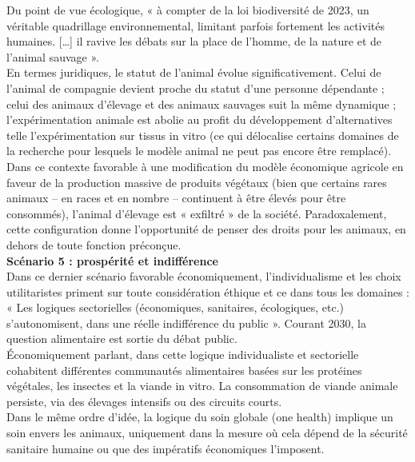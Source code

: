 \documentclass[10pt]{article}
\begin{document}
Du point de vue écologique, « à compter de la loi biodiversité de 2023, un véritable quadrillage environnemental, limitant parfois fortement les activités humaines. […] il ravive les débats sur la place de l’homme, de la nature et de l’animal sauvage ».\\

En termes juridiques, le statut de l’animal évolue significativement. Celui de l’animal de compagnie devient proche du statut d’une personne dépendante ; celui des animaux d’élevage et des animaux sauvages suit la même dynamique ; l’expérimentation animale est abolie au profit du développement d’alternatives telle l’expérimentation sur tissus in vitro (ce qui délocalise certains domaines de la recherche pour lesquels le modèle animal ne peut pas encore être remplacé).\\

Dans ce contexte favorable à une modification du modèle économique agricole en faveur de la production massive de produits végétaux (bien que certains rares animaux – en races et en nombre – continuent à être élevés pour être consommés), l’animal d’élevage est « exfiltré » de la société. Paradoxalement, cette configuration donne l’opportunité de penser des droits pour les animaux, en dehors de toute fonction préconçue.\\

\textbf{Scénario 5 : prospérité et indifférence}\\

Dans ce dernier scénario favorable économiquement, l’individualisme et les choix utilitaristes priment sur toute considération éthique et ce dans tous les domaines : « Les logiques sectorielles (économiques, sanitaires, écologiques, etc.) s’autonomisent, dans une réelle indifférence du public ». Courant 2030, la question alimentaire est sortie du débat public.\\

Économiquement parlant, dans cette logique individualiste et sectorielle cohabitent différentes communautés alimentaires basées sur les protéines végétales, les insectes et la viande in vitro. La consommation de viande animale persiste, via des élevages intensifs ou des circuits courts.\\

Dans le même ordre d’idée, la logique du soin globale (one health) implique un soin envers les animaux, uniquement dans la mesure où cela dépend de la sécurité sanitaire humaine ou que des impératifs économiques l’imposent.\\
\end{document}
